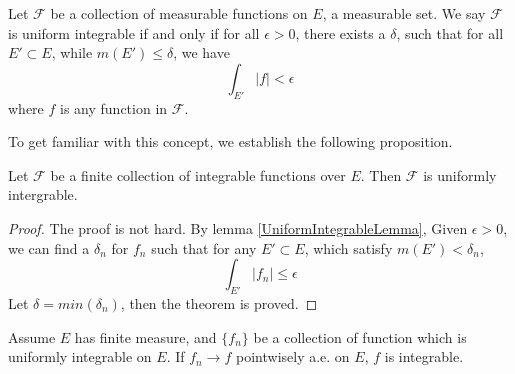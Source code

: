 \documentclass[lang=en, 12pt]{elegantbook}
\begin{document}
        \begin{definition}
            Let $\mathcal{F}$ be a collection of measurable functions on $E$,
        a measurable set.
        We say $\mathcal{F}$ is uniform integrable if and only if for all
        $\epsilon >0$, there exists a $\delta$, such that for all $E'\subset E$, 
        while $m(E') \leq \delta$, we have
        \begin{equation}
            \int_{E'} |f| < \epsilon 
        \end{equation}
        where $f$ is any function in $\mathcal{F}$.
        \end{definition}
        To get familiar with this concept, we establish the following
        proposition.
        \begin{proposition}
            Let $\mathcal{F}$ be a finite collection of integrable functions over $E$.
        Then $\mathcal{F}$ is uniformly intergrable.
        \end{proposition}
        \begin{proof}
            The proof is not hard. By lemma \ref{UniformIntegrableLemma},
        Given $\epsilon>0$, 
        we can find a $\delta_n$ for $f_n$ such that for any $E'\subset E$,
        which satisfy $m(E') < \delta_n$,
        $$\int_{E'} |f_n| \leq \epsilon $$
        Let $\delta = min(\delta_n)$, then the theorem is proved.
        \end{proof}
        \begin{proposition}\label{LimitFunctionOfUniformIntegrable}
            Assume $E$ has finite measure, and $\{f_n\}$ be a collection of 
        function which is uniformly integrable on $E$. If $f_n \to f$ 
        pointwisely a.e. on $E$, $f$ is integrable.
        \end{proposition}
\end{document}
